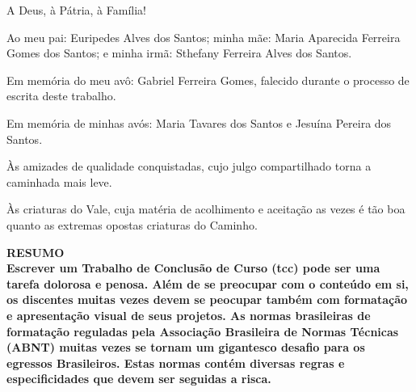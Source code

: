 \documentclass[12pt,a4paper,oneside,brazil]{abntex2}
\begin{document}
\vspace{10mm}

A Deus, à Pátria, à Família!

\vspace{20mm}

Ao meu pai: Euripedes Alves dos Santos; minha mãe: Maria
Aparecida Ferreira Gomes dos Santos; e minha irmã:
Sthefany Ferreira Alves dos Santos.

\vspace{10mm}

Em memória do meu avô: Gabriel Ferreira Gomes, falecido durante
o processo de escrita deste trabalho.

\vspace{10mm}

Em memória de minhas avós: Maria Tavares dos Santos e
Jesuína Pereira dos Santos.

\vspace{10mm}

Às amizades de qualidade conquistadas, cujo julgo compartilhado
torna a caminhada mais leve.

\vspace{30mm}


Às criaturas do Vale, cuja matéria de acolhimento e aceitação
as vezes é tão boa quanto as extremas opostas criaturas do Caminho.



\clearpage



\centering
\ABNTEXchapterfont\bfseries{\textsc{\MakeUppercase{Resumo}}}\\
\vspace*{3cm}
\justifying
\normalfont
Escrever um Trabalho de Conclusão de Curso (\acrshort{tcc}) pode ser uma tarefa dolorosa e penosa.
Além de se preocupar com o conteúdo em si, os discentes muitas vezes devem se peocupar também com formatação e
apresentação visual de seus projetos. As normas brasileiras de formatação reguladas pela Associação Brasileira de Normas Técnicas
(ABNT) muitas vezes se tornam um gigantesco desafio para os egressos Brasileiros. Estas normas contém diversas regras
e especificidades que devem ser seguidas a risca.
\end{document}
